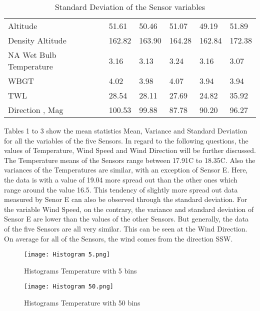\documentclass{article}
\begin{document}
\begin{table}[H]
{\begin{tabular}{l|lllll}
Altitude                     & 51.61             & 50.46             & 51.07             & 49.19             & 51.89             \\
Density Altitude             & 162.82            & 163.90            & 164.28            & 162.84            & 172.38            \\
NA Wet Bulb Temperature      & 3.16              & 3.13              & 3.24              & 3.16              & 3.07              \\
WBGT                         & 4.02              & 3.98              & 4.07              & 3.94              & 3.94              \\
TWL                          & 28.54             & 28.11             & 27.69             & 24.82             & 35.92             \\
Direction ‚ Mag              & 100.53            & 99.88             & 87.78             & 90.20             & 96.27            
\end{tabular}%
}
\caption{Standard Deviation of the Sensor variables}
\label{tab:my-table}
\end{table}

Tables 1 to 3 show the mean statistics Mean, Variance and Standard Deviation for all the variables of the five Sensors. In regard to the following questions, the values of Temperature, Wind Speed and Wind Direction will be further discussed. The Temperature means of the Sensors range between 17.91\textdegree{}C to 18.35\textdegree{}C. Also the variances of the Temperatures are similar, with an exception of Sensor E. Here, the data is with a value of 19.04 more spread out than the other ones which range around the value 16.5. This tendency of slightly more spread out data measured by Senor E can also be observed through the standard deviation. For the variable Wind Speed, on the contrary, the variance and standard deviation of Sensor E are lower than the values of the other Sensors. But generally, the data of the five Sensors are all very similar. This can be seen at the Wind Direction. On average for all of the Sensors, the wind comes from the direction SSW.

\begin{figure} [H]
  \texttt{[image: Histogram 5.png]}
  \caption{Histograms Temperature with 5 bins}
  \label{fig:Histogram5}
\end{figure}

\begin{figure}[H]
  \texttt{[image: Histogram 50.png]}
  \caption{Histograms Temperature with 50 bins}
  \label{fig:Histogram50}
\end{figure}
\end{document}
